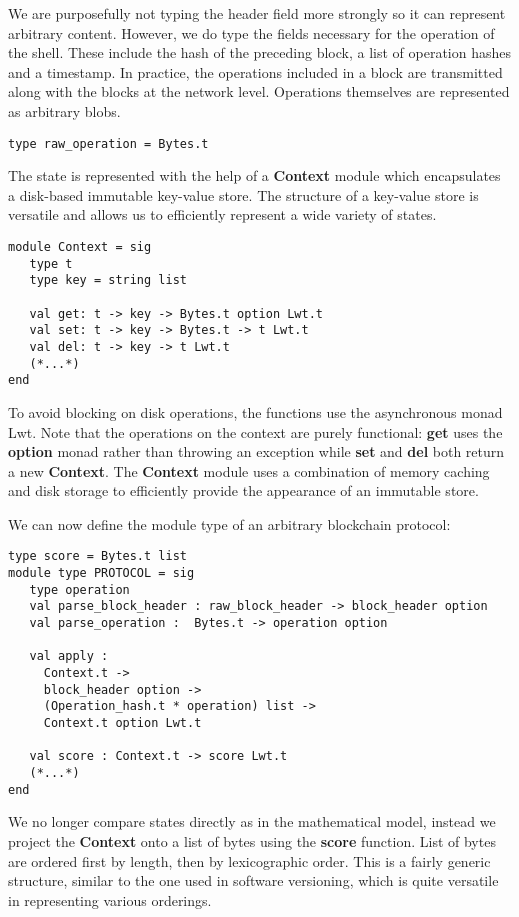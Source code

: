 \documentclass[letterpaper]{article}
\begin{document}
We are purposefully not typing the header field more strongly so it can
represent arbitrary content. However, we do type the fields necessary for the
operation of the shell. These include the hash of the preceding block, a list of
operation hashes and a timestamp. In practice, the operations included in a
block are transmitted along with the blocks at the network level. Operations
themselves are represented as arbitrary blobs.

\begin{lstlisting}
type raw_operation = Bytes.t
\end{lstlisting}

The state is represented with the help of a \textbf{Context} module which
encapsulates a disk-based immutable key-value store. The structure of a
key-value store is versatile and allows us to efficiently represent a wide
variety of states.

\begin{lstlisting}
module Context = sig
   type t
   type key = string list

   val get: t -> key -> Bytes.t option Lwt.t
   val set: t -> key -> Bytes.t -> t Lwt.t
   val del: t -> key -> t Lwt.t
   (*...*)
end
\end{lstlisting}

To avoid blocking on disk operations, the functions use the asynchronous monad
Lwt\cite{LWT}. Note that the operations on the context are purely functional:
\textbf{get} uses the \textbf{option} monad rather than throwing an exception
while \textbf{set} and \textbf{del} both return a new \textbf{Context}.
The \textbf{Context} module uses a combination of memory caching and disk
storage to efficiently provide the appearance of an immutable store.

We can now define the module type of an arbitrary blockchain protocol:

\begin{lstlisting}
type score = Bytes.t list
module type PROTOCOL = sig
   type operation
   val parse_block_header : raw_block_header -> block_header option
   val parse_operation :  Bytes.t -> operation option

   val apply :
     Context.t ->
     block_header option ->
     (Operation_hash.t * operation) list ->
     Context.t option Lwt.t

   val score : Context.t -> score Lwt.t
   (*...*)
end
\end{lstlisting}

We no longer compare states directly as in the mathematical model, instead we
project the \textbf{Context} onto a list of bytes using the \textbf{score}
function. List of bytes are ordered first by length, then by
lexicographic order. This is a fairly generic structure, similar to the one used
in software versioning, which is quite versatile in representing various
orderings. 
\end{document}
